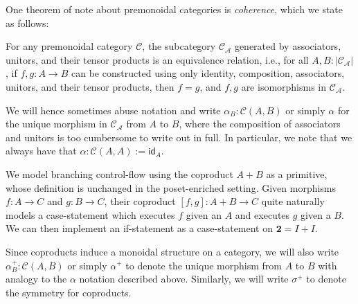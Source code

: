 \documentclass[acmsmall,screen,anonymous,review]{acmart}
\newcommand{\mc}[1]{\ensuremath{\mathcal{#1}}}
\newcommand{\mb}[1]{\ensuremath{\mathbf{#1}}}
\newcommand{\ms}[1]{\ensuremath{\mathsf{#1}}}
\begin{document}
One theorem of note about premonoidal categories is \emph{coherence}, which we state as follows:
\begin{theorem}
  For any premonoidal category $\mc{C}$, the subcategory $\mc{C}_\mc{A}$ generated by associators,
  unitors, and their tensor products is an equivalence relation, i.e., for all $A, B :
  |\mc{C}_\mc{A}|$, if $f, g : A \to B$ can be constructed using only identity, composition,
  associators, unitors, and their tensor products, then $f = g$, and $f, g$ are isomorphisms in
  $\mc{C}_\mc{A}$.
  \label{thm:monoidal-coherence}
\end{theorem}
We will hence sometimes abuse notation and write $\alpha_B : \mc{C}(A, B)$ or simply $\alpha$ for
the unique morphism in $\mc{C}_\mc{A}$ from $A$ to $B$, where the composition of associators and
unitors is too cumbersome to write out in full. In particular, we note that we always have that
$\alpha: \mc{C}(A, A) := \ms{id}_A$.

We model branching control-flow using the coproduct $A + B$ as a primitive, whose definition is
unchanged in the poset-enriched setting. Given morphisms $f : A \to C$ and $g : B \to C$, their
coproduct $[f, g] : A + B \to C$ quite naturally models a case-statement which executes $f$ given an
$A$ and executes $g$ given a $B$. We can then implement an if-statement as a case-statement on
$\mb{2} = I + I$.

Since coproducts induce a monoidal structure on a category, we will also write $\alpha^+_B :
\mc{C}(A, B)$ or simply $\alpha^+$ to denote the unique morphism from $A$ to $B$ with analogy to the
$\alpha$ notation described above. Similarly, we will write $\sigma^+$ to denote the symmetry for
coproducts.
\end{document}

